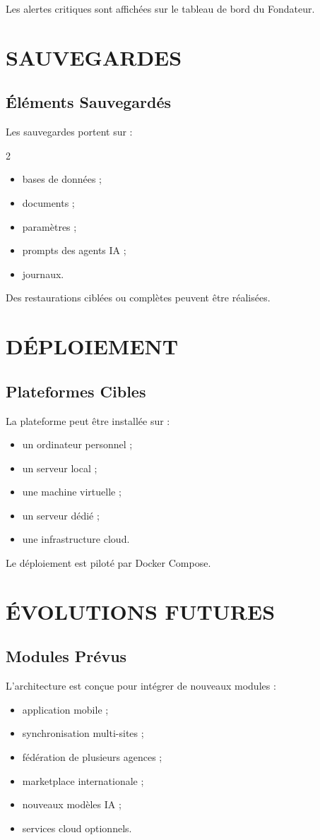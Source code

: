 \documentclass[12pt,a4paper,oneside]{book}
\begin{document}
Les alertes critiques sont affichées sur le tableau de bord du Fondateur.

\chapter{SAUVEGARDES}

\section{Éléments Sauvegardés}
Les sauvegardes portent sur :
\begin{multicols}{2}
\begin{itemize}
\item bases de données ;
\item documents ;
\item paramètres ;
\item prompts des agents IA ;
\item journaux.
\end{itemize}
\end{multicols}

Des restaurations ciblées ou complètes peuvent être réalisées.

\chapter{DÉPLOIEMENT}

\section{Plateformes Cibles}
La plateforme peut être installée sur :
\begin{itemize}
\item un ordinateur personnel ;
\item un serveur local ;
\item une machine virtuelle ;
\item un serveur dédié ;
\item une infrastructure cloud.
\end{itemize}

Le déploiement est piloté par Docker Compose.

\chapter{ÉVOLUTIONS FUTURES}

\section{Modules Prévus}
L'architecture est conçue pour intégrer de nouveaux modules :
\begin{itemize}
\item application mobile ;
\item synchronisation multi-sites ;
\item fédération de plusieurs agences ;
\item marketplace internationale ;
\item nouveaux modèles IA ;
\item services cloud optionnels.
\end{itemize}
\end{document}
